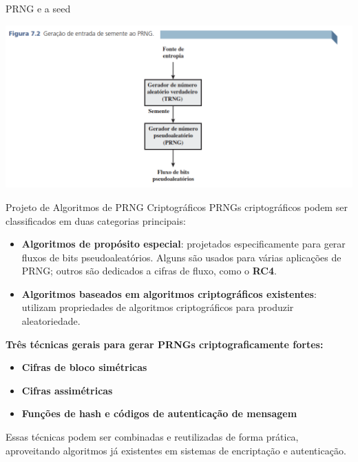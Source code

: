 \begin{frame}{PRNG e a seed}

\centering
\includegraphics[width=0.9\linewidth]{Figuras/semente-entrando-prng.png}


\end{frame}

\begin{frame}{Projeto de Algoritmos de PRNG Criptográficos}
PRNGs criptográficos podem ser classificados em duas categorias principais:

\begin{itemize}
    \item \textbf{Algoritmos de propósito especial}: projetados especificamente para gerar fluxos de bits pseudoaleatórios. Alguns são usados para várias aplicações de PRNG; outros são dedicados a cifras de fluxo, como o \textbf{RC4}.
    \item \textbf{Algoritmos baseados em algoritmos criptográficos existentes}: utilizam propriedades de algoritmos criptográficos para produzir aleatoriedade.
\end{itemize}

\medskip

\textbf{Três técnicas gerais para gerar PRNGs criptograficamente fortes:}
\begin{itemize}
    \item \textbf{Cifras de bloco simétricas} 
    \item \textbf{Cifras assimétricas} 
    \item \textbf{Funções de hash e códigos de autenticação de mensagem} 
\end{itemize}

\medskip
Essas técnicas podem ser combinadas e reutilizadas de forma prática, aproveitando algoritmos já existentes em sistemas de encriptação e autenticação.
\end{frame}


